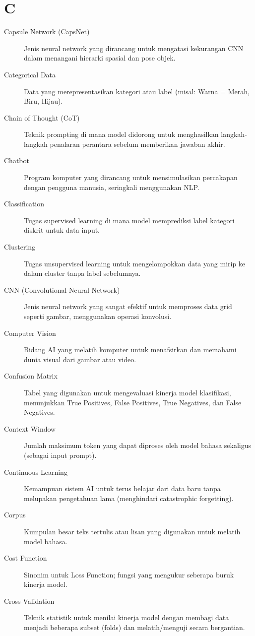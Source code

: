 \section*{C}
\begin{description}
    \item[Capsule Network (CapsNet)] Jenis neural network yang dirancang untuk mengatasi kekurangan CNN dalam menangani hierarki spasial dan pose objek.
    \item[Categorical Data] Data yang merepresentasikan kategori atau label (misal: Warna = Merah, Biru, Hijau).
    \item[Chain of Thought (CoT)] Teknik prompting di mana model didorong untuk menghasilkan langkah-langkah penalaran perantara sebelum memberikan jawaban akhir.
    \item[Chatbot] Program komputer yang dirancang untuk mensimulasikan percakapan dengan pengguna manusia, seringkali menggunakan NLP.
    \item[Classification] Tugas supervised learning di mana model memprediksi label kategori diskrit untuk data input.
    \item[Clustering] Tugas unsupervised learning untuk mengelompokkan data yang mirip ke dalam cluster tanpa label sebelumnya.
    \item[CNN (Convolutional Neural Network)] Jenis neural network yang sangat efektif untuk memproses data grid seperti gambar, menggunakan operasi konvolusi.
    \item[Computer Vision] Bidang AI yang melatih komputer untuk menafsirkan dan memahami dunia visual dari gambar atau video.
    \item[Confusion Matrix] Tabel yang digunakan untuk mengevaluasi kinerja model klasifikasi, menunjukkan True Positives, False Positives, True Negatives, dan False Negatives.
    \item[Context Window] Jumlah maksimum token yang dapat diproses oleh model bahasa sekaligus (sebagai input prompt).
    \item[Continuous Learning] Kemampuan sistem AI untuk terus belajar dari data baru tanpa melupakan pengetahuan lama (menghindari catastrophic forgetting).
    \item[Corpus] Kumpulan besar teks tertulis atau lisan yang digunakan untuk melatih model bahasa.
    \item[Cost Function] Sinonim untuk Loss Function; fungsi yang mengukur seberapa buruk kinerja model.
    \item[Cross-Validation] Teknik statistik untuk menilai kinerja model dengan membagi data menjadi beberapa subset (folds) dan melatih/menguji secara bergantian.
\end{description}

